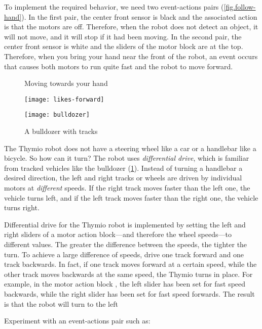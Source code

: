To implement the required behavior, we need two event-actions pairs
(\cref{fig.follow-hand}). In the first pair, the center front sensor is
black and the associated action is that the motors are off. Therefore,
when the robot does not detect an object, it will not move, and it will
stop if it had been moving. In the second pair, the center front sensor
is white and the sliders of the motor block are at the top. Therefore,
when you bring your hand near the front of the robot, an event occurs
that causes both motors to run quite fast and the robot to move forward.

\begin{figure}
\begin{floatrow}
	\ffigbox
	{\caption{Moving towards your hand}\label{fig.follow-hand}}
	{\texttt{[image: likes-forward]}}
	\ffigbox
	{\caption{A bulldozer with tracks}\label{fig.bull}}
	{\texttt{[image: bulldozer]}}
\end{floatrow}
\end{figure}


The Thymio robot does not have a steering wheel like a car or a
handlebar like a bicycle. So how can it turn? The robot uses
\emph{differential drive}, which is familiar from tracked vehicles like
the bulldozer (\cref{fig.bull}). Instead of turning a handlebar a
desired direction, the left and right tracks or wheels are driven by
individual motors at \emph{different} speeds. If the right track moves
faster than the left one, the vehicle turns left, and if the left track
moves faster than the right one, the vehicle turns right.

Differential drive for the Thymio robot is implemented by setting the
left and right sliders of a motor action block---and therefore the wheel
speeds---to different values. The greater the difference between the
speeds, the tighter the turn. To achieve a large difference of speeds,
drive one track forward and one track backwards. In fact, if one
track moves forward at a certain speed, while the other track moves
backwards at the same speed, the Thymio turns in place. For example, in
the motor action block , the left slider has been
set for fast speed backwards, while the right slider has been set for
fast speed forwards. The result is that the robot will turn to the left

\newpage

Experiment with an event-actions pair such as: 

